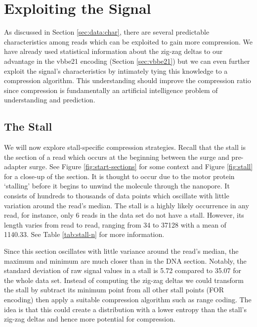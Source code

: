 \section{Exploiting the Signal}

As discussed in Section
\ref{sec:data:char},
there are several predictable characteristics among reads which can be exploited
to gain more compression.
We have already used statistical information about the zig-zag deltas to our
advantage in the vbbe21 encoding (Section \ref{sec:vbbe21}) but we can even
further exploit the signal's characteristics by intimately tying this knowledge
to a compression algorithm. This understanding should improve the compression
ratio since compression is fundamentally an artificial intelligence problem of
understanding and prediction.



\subsection{The Stall}



We will now explore stall-specific compression strategies.
Recall that the stall is the section of a read which occurs at
the beginning between the surge and pre-adapter surge. See Figure
\ref{fig:start-sections} for some context and Figure \ref{fig:stall} for a
close-up of the section. It is thought to occur due to the motor protein `stalling'
before it begins to unwind the molecule through the nanopore. It consists of
hundreds to thousands of data points which oscillate with little variation
around the read's median. The stall is a highly likely occurrence in any read,
for instance, only 6 reads in the data set do not have a stall.
However, its length varies from read to read, ranging from 34 to \num{37128}
with a mean of 1140.33. See Table \ref{tab:stall-n} for more information.



Since this section oscillates with little variance around the read's median,
the maximum and minimum are much closer than in the DNA section.
Notably, the standard deviation of raw signal values in a stall is 5.72 compared
to 35.07 for the whole data set.
Instead of computing the zig-zag deltas we could transform the stall by subtract
its minimum point from all other stall points (FOR encoding) then
apply a suitable compression algorithm such as range coding. The idea is that
this could create a distribution with a lower entropy than the stall's zig-zag
deltas and hence more potential for compression.

